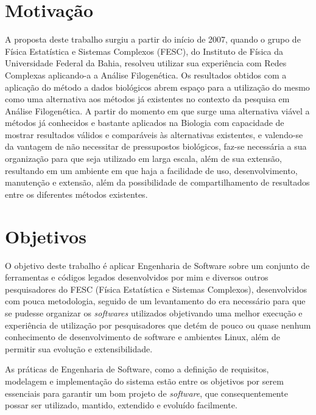 \section{Motivação}

A proposta deste trabalho surgiu a partir do início de 2007, quando o grupo de Física Estatística e Sistemas Complexos (FESC),
do Instituto de Física da Universidade Federal da Bahia, resolveu utilizar sua experiência com Redes Complexas aplicando-a a Análise Filogenética.
Os resultados obtidos com a aplicação do método a dados biológicos abrem espaço para a utilização do mesmo como uma alternativa aos métodos
já existentes no contexto da pesquisa em Análise Filogenética. A partir do momento em que surge uma alternativa viável a métodos já conhecidos
e bastante aplicados na Biologia com capacidade de mostrar resultados válidos e comparáveis às alternativas existentes, e valendo-se da vantagem
de não necessitar de pressupostos biológicos, faz-se necessária a sua organização para que seja utilizado em larga escala, além de sua extensão,
resultando em um ambiente em que haja a facilidade de uso, desenvolvimento, manutenção e extensão, além da possibilidade de compartilhamento de
resultados entre os diferentes métodos existentes.

\section{Objetivos} \label{sec:objetivos}

O objetivo deste trabalho é aplicar Engenharia de Software sobre um conjunto de ferramentas e códigos legados desenvolvidos por mim e diversos outros
pesquisadores do FESC (Física Estatística e Sistemas Complexos), desenvolvidos com pouca metodologia, seguido de um levantamento do era necessário para que
se pudesse organizar os \textit{softwares} utilizados objetivando uma melhor execução e experiência de utilização por pesquisadores que detém de pouco
ou quase nenhum conhecimento de desenvolvimento de software e ambientes Linux, além de permitir sua evolução e extensibilidade.

As práticas de Engenharia de Software, como a definição de requisitos, modelagem e implementação do sistema estão entre os objetivos por serem essenciais
para garantir um bom projeto de \textit{software}, que consequentemente possar ser utilizado, mantido, extendido e evoluído facilmente.


